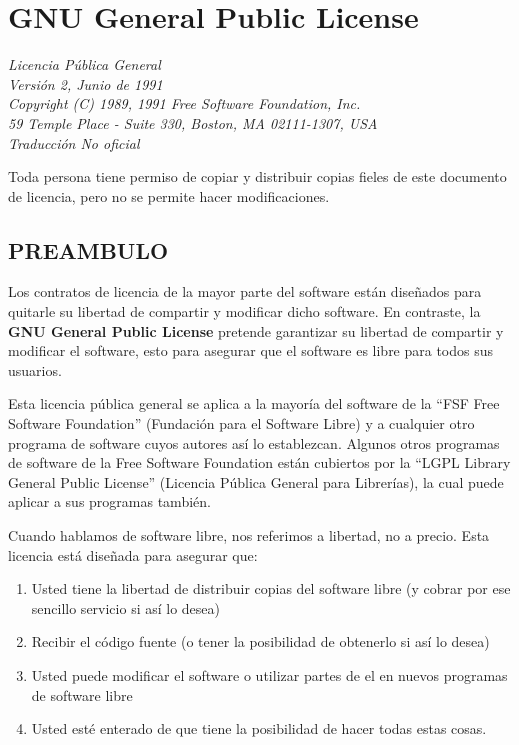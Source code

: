 \chapter{GNU General Public License}
\label{licencia_gnu}
\textit{Licencia Pública General\\
Versión 2, Junio de 1991\\
Copyright (C) 1989, 1991 Free Software Foundation, Inc.\\
59 Temple Place - Suite 330, Boston, MA 02111-1307, USA\\
Traducción No oficial}

Toda persona tiene permiso de copiar y distribuir copias fieles de este documento de licencia, pero no se permite hacer modificaciones.

\section{PREAMBULO}

Los contratos de licencia de la mayor parte del software están diseñados para quitarle su libertad de compartir y modificar dicho software. En contraste, la \textbf{GNU General Public License} pretende garantizar su libertad de compartir y modificar el software, esto para asegurar que el software es libre para todos sus usuarios.

Esta licencia pública general se aplica a la mayoría del software de la “FSF Free Software Foundation” (Fundación para el Software Libre) y a cualquier otro programa de software cuyos autores así lo establezcan. Algunos otros programas de software de la Free Software Foundation están cubiertos por la “LGPL Library General Public License” (Licencia Pública General para Librerías), la cual puede aplicar a sus programas también.

Cuando hablamos de software libre, nos referimos a libertad, no a precio. Esta licencia está diseñada para asegurar que: 

\begin{enumerate}
\item Usted tiene la libertad de distribuir copias del software libre (y cobrar por ese sencillo servicio si así lo desea) 
\item Recibir el código fuente (o tener la posibilidad de obtenerlo si así lo desea) 
\item Usted puede modificar el software o utilizar partes de el en nuevos programas de software libre 
\item Usted esté enterado de que tiene la posibilidad de hacer todas estas cosas. 
\end{enumerate}


